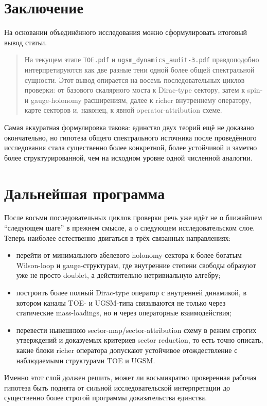 \documentclass[12pt,a4paper]{article}
\begin{document}
\section{Заключение}

На основании объединённого исследования можно сформулировать итоговый вывод статьи.

\begin{quote}
На текущем этапе \texttt{TOE.pdf} и \texttt{ugsm\_dynamics\_audit-3.pdf} правдоподобно интерпретируются как две разные тени одной более общей спектральной сущности. Этот вывод опирается на восемь последовательных циклов проверки: от базового скалярного моста к Dirac-type сектору, затем к spin- и gauge-holonomy расширениям, далее к richer внутреннему оператору, карте секторов и, наконец, к явной operator-attribution схеме.
\end{quote}

Самая аккуратная формулировка такова: единство двух теорий ещё не доказано окончательно, но гипотеза общего спектрального источника после проведённого исследования стала существенно более конкретной, более устойчивой и заметно более структурированной, чем на исходном уровне одной численной аналогии.

\section{Дальнейшая программа}

После восьми последовательных циклов проверки речь уже идёт не о ближайшем ``следующем шаге'' в прежнем смысле, а о следующем исследовательском слое. Теперь наиболее естественно двигаться в трёх связанных направлениях:
\begin{itemize}
    \item перейти от минимального абелевого holonomy-сектора к более богатым Wilson-loop и gauge-структурам, где внутренние степени свободы образуют уже не просто doublet, а действительно нетривиальную алгебру;
    \item построить более полный Dirac-type оператор с внутренней динамикой, в котором каналы TOE- и UGSM-типа связываются не только через статические mass-loadings, но и через операторные взаимодействия;
    \item перевести нынешнюю sector-map/sector-attribution схему в режим строгих утверждений и доказуемых критериев sector reduction, то есть точно описать, какие блоки richer оператора допускают устойчивое отождествление с наблюдаемыми структурами TOE и UGSM.
\end{itemize}

Именно этот слой должен решить, может ли восьмикратно проверенная рабочая гипотеза быть поднята от сильной исследовательской интерпретации до существенно более строгой программы доказательства единства.
\end{document}
